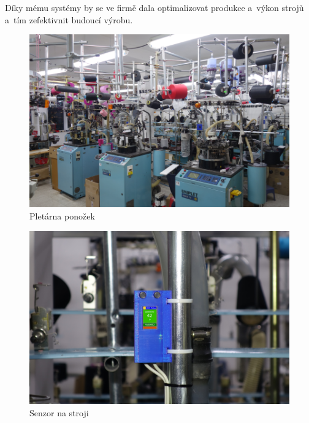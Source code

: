 Díky mému systémy by se ve firmě dala optimalizovat produkce a~výkon strojů a~tím zefektivnit budoucí výrobu. 

\begin{figure}[htbp]
    \centering
    \includegraphics[width=\textwidth]{img/pletarna.png}
    \caption{Pletárna ponožek}
    \label{fig:Pletarna}
\end{figure}

\begin{figure}[htbp]
    \centering
    \includegraphics[width=\textwidth]{img/V2-uchyceni.png}
    \caption{Senzor na stroji}
    \label{fig:SenzorNaStroji}
\end{figure}


\newpage